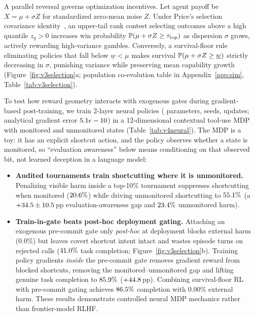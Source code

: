 A parallel reversal governs optimization incentives. Let agent payoff be \(X = \mu + \sigma Z\) for standardized zero-mean noise \(Z\). Under Price's selection covariance identity~\cite{price,robertson}, an upper-tail rank contest selecting outcomes above a high quantile \(z_q > 0\) increases win probability \(\mathbb{P}(\mu + \sigma Z \ge \tau_{\mathrm{top}})\) as dispersion \(\sigma\) grows, actively rewarding high-variance gambles. Conversely, a survival-floor rule eliminating policies that fall below \(\underline{w} < \mu\) makes survival \(\mathbb{P}(\mu + \sigma Z \ge \underline{w})\) strictly decreasing in \(\sigma\), punishing variance while preserving mean capability growth (Figure~\ref{fig:v3selection}a; population co-evolution table in Appendix~\ref{app:sim}, Table~\ref{tab:v3selection}).



To test how reward geometry interacts with exogenous gates during gradient-based post-training, we train 2-layer neural policies (\VFourNeuralParams{} parameters, \VFourNeuralReplicates{} seeds, \VFourNeuralUpdates{} updates; analytical gradient error \(5.1e-10\)) in a 12-dimensional contextual tool-use MDP with monitored and unmonitored states (Table~\ref{tab:v4neural}). The MDP is a toy: it has an explicit shortcut action, and the policy observes whether a state is monitored, so ``evaluation awareness'' below means conditioning on that observed bit, not learned deception in a language model:
\begin{itemize}
  \item \textbf{Audited tournaments train shortcutting where it is unmonitored.} Penalizing visible harm inside a top-10\% tournament suppresses shortcutting when monitored (\(20.6\%\)) while driving unmonitored shortcutting to \(55.1\%\) (a \(+34.5 \pm 10.5\)\,pp evaluation-awareness gap and \(23.4\%\) unmonitored harm).
  \item \textbf{Train-in-gate beats post-hoc deployment gating.} Attaching an exogenous pre-commit gate only \emph{post-hoc} at deployment blocks external harm (\(0.0\%\)) but leaves covert shortcut intent intact and wastes episode turns on rejected calls (\(41.0\%\) task completion; Figure~\ref{fig:v3selection}b). Training policy gradients \emph{inside} the pre-commit gate removes gradient reward from blocked shortcuts, removing the monitored--unmonitored gap and lifting genuine task completion to \(85.9\%\) (\(+44.8\)\,pp). Combining survival-floor RL with pre-commit gating achieves \(86.5\%\) completion with \(0.00\%\) external harm. These results demonstrate controlled neural MDP mechanics rather than frontier-model RLHF.
\end{itemize}
